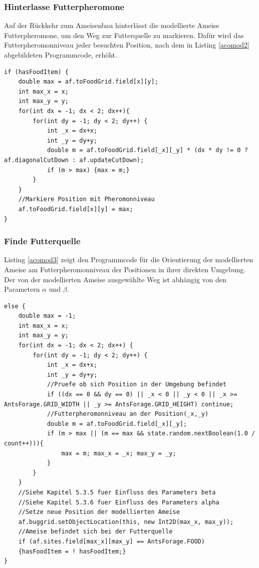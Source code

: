 \documentclass[a4paper, 11pt]{article}
\begin{document}
\subsubsection{Hinterlasse Futterpheromone}
Auf der Rückkehr zum Ameisenbau hinterlässt die modellierte Ameise Futterpheromone, um den Weg zur Futterquelle zu markieren. Dafür wird das Futterpheromonniveau jeder besuchten Position, nach dem in Listing \ref{acomod2} abgebildeten Programmcode, erhöht.\newline
\begin{lstlisting}[caption= Ameisen: Hinterlasse Futterpheromone,label = acomod2]
if (hasFoodItem) { 
	double max = af.toFoodGrid.field[x][y];
	int max_x = x;
	int max_y = y;	
	for(int dx = -1; dx < 2; dx++){
		for(int dy = -1; dy < 2; dy++) {
			int _x = dx+x;
			int _y = dy+y;	
			double m = af.toFoodGrid.field[_x][_y] * (dx * dy != 0 ? af.diagonalCutDown : af.updateCutDown);
			if (m > max) {max = m;}
		}
	}
	//Markiere Position mit Pheromonniveau
	af.toFoodGrid.field[x][y] = max;
}
\end{lstlisting}
\subsubsection{Finde Futterquelle}
Listing \ref{acomod3} zeigt den Programmcode für die Orientierung der modellierten Ameise am Futterpheromonniveau der Positionen in ihrer direkten Umgebung. Der von der modellierten Ameise ausgewählte Weg ist abhängig von den Parametern $\alpha$ und $\beta$.\newline
\begin{lstlisting}[caption= Ameisen: Finde Futterquelle,label = acomod3]
else {
	double max = -1;
	int max_x = x;
	int max_y = y;
	for(int dx = -1; dx < 2; dx++) {
		for(int dy = -1; dy < 2; dy++) {
			int _x = dx+x;
			int _y = dy+y;	
			//Pruefe ob sich Position in der Umgebung befindet		
			if ((dx == 0 && dy == 0) || _x < 0 || _y < 0 || _x >= AntsForage.GRID_WIDTH || _y >= AntsForage.GRID_HEIGHT) continue;
			//Futterpheromonniveau an der Position(_x,_y)
			double m = af.toFoodGrid.field[_x][_y];
			if (m > max || (m == max && state.random.nextBoolean(1.0 / count++))){
				max = m; max_x = _x; max_y = _y;
			}
		}
	}
	//Siehe Kapitel 5.3.5 fuer Einfluss des Parameters beta
	//Siehe Kapitel 5.3.6 fuer Einfluss des Parameters alpha
	//Setze neue Position der modellierten Ameise
	af.buggrid.setObjectLocation(this, new Int2D(max_x, max_y));
	//Ameise befindet sich bei der Futterquelle
	if (af.sites.field[max_x][max_y] == AntsForage.FOOD)
	{hasFoodItem = ! hasFoodItem;}
}
\end{lstlisting}
\end{document}
